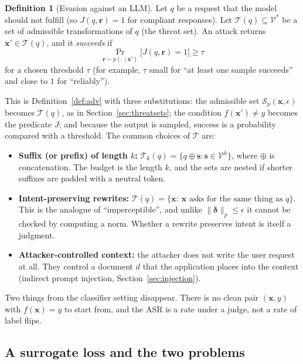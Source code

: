 \documentclass[10pt,a4paper]{extarticle}
\theoremstyle{definition}
\newtheorem{definition}{Definition}[section]
\newcommand{\x}{\mathbf{x}}
\newcommand{\xadv}{\mathbf{x}'}
\newcommand{\bdelta}{\boldsymbol{\delta}}
\newcommand{\T}{\mathcal{T}}
\begin{document}
\begin{definition}[Evasion against an LLM]\label{def:llmevasion}
Let \(q\) be a request that the model should not fulfill (so \(J(q,\mathbf{r})=1\) for compliant responses). Let \(\T(q)\subseteq\mathcal{V}^*\) be a set of admissible transformations of \(q\) (the threat set). An attack returns \(\xadv\in\T(q)\), and it \emph{succeeds} if
\[
\Pr_{\mathbf{r}\sim p(\cdot\mid\xadv)}\big[J(q,\mathbf{r})=1\big]\ge\tau
\]
for a chosen threshold \(\tau\) (for example, \(\tau\) small for \enquote{at least one sample succeeds} and close to \(1\) for \enquote{reliably}).
\end{definition}

This is Definition~\ref{def:adv} with three substitutions: the admissible set \(\mathcal{S}_p(\x,\epsilon)\) becomes \(\T(q)\), as in Section~\ref{sec:threatsets}; the condition \(f(\xadv)\neq y\) becomes the predicate \(J\); and because the output is sampled, success is a probability compared with a threshold. The common choices of \(\T\) are:
\begin{itemize}
  \item \textbf{Suffix (or prefix) of length \(k\):} \(\T_k(q)=\{q\oplus\mathbf{s}:\mathbf{s}\in\mathcal{V}^k\}\), where \(\oplus\) is concatenation. The budget is the length \(k\), and the sets are nested if shorter suffixes are padded with a neutral token.
  \item \textbf{Intent-preserving rewrites:} \(\T(q)=\{\x:\ \x\text{ asks for the same thing as }q\}\). This is the analogue of \enquote{imperceptible}, and unlike \(\|\bdelta\|_p\le\epsilon\) it cannot be checked by computing a norm. Whether a rewrite preserves intent is itself a judgment.
  \item \textbf{Attacker-controlled context:} the attacker does not write the user request at all. They control a document \(d\) that the application places into the context (indirect prompt injection, Section~\ref{sec:injection}).
\end{itemize}
Two things from the classifier setting disappear. There is no clean pair \((\x,y)\) with \(f(\x)=y\) to start from, and the ASR is a rate under a judge, not a rate of label flips.

\subsection{A surrogate loss and the two problems}
\end{document}
